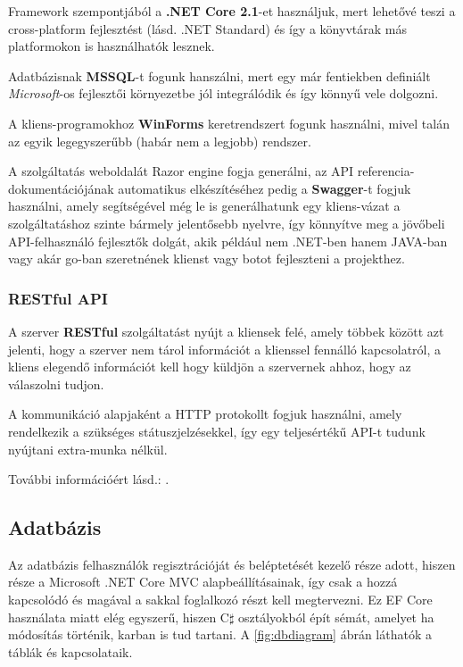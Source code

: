 \documentclass[twoside, a4paper, 12pt]{book}
\begin{document}
Framework szempontjából a \textbf{.NET Core 2.1}-et használjuk, mert lehetővé teszi a cross-platform fejlesztést (lásd. .NET Standard) és így a könyvtárak más platformokon is használhatók lesznek.

Adatbázisnak \textbf{MSSQL}-t fogunk hanszálni, mert egy már fentiekben definiált \textit{Microsoft}-os fejlesztői környezetbe jól integrálódik és így könnyű vele dolgozni.

A kliens-programokhoz \textbf{WinForms} keretrendszert fogunk használni, mivel talán az egyik legegyszerűbb (habár nem a legjobb) rendszer.

A szolgáltatás weboldalát Razor engine fogja generálni, az API referencia-dokumentációjának automatikus elkészítéséhez pedig a \textbf{Swagger}-t fogjuk használni, amely segítségével még le is generálhatunk egy kliens-vázat a szolgáltatáshoz szinte bármely jelentősebb nyelvre, így könnyítve meg a jövőbeli API-felhasználó fejlesztők dolgát, akik például nem .NET-ben hanem JAVA-ban vagy akár go-ban szeretnének klienst vagy botot fejleszteni a projekthez.

\subsubsection{RESTful API}
A szerver \textbf{RESTful} szolgáltatást nyújt a kliensek felé, amely többek között azt jelenti, hogy a szerver nem tárol információt a klienssel fennálló kapcsolatról, a kliens elegendő információt kell hogy küldjön a szervernek ahhoz, hogy az válaszolni tudjon.

A kommunikáció alapjaként a HTTP protokollt fogjuk használni, amely rendelkezik a szükséges státuszjelzésekkel, így egy teljesértékű API-t tudunk nyújtani extra-munka nélkül.

További információért lásd.: \cite{restfulEn}.

\subsection{Adatbázis}
Az adatbázis felhasználók regisztrációját és beléptetését kezelő része adott, hiszen része a Microsoft .NET Core MVC alapbeállításainak, így csak a hozzá kapcsolódó és magával a sakkal foglalkozó részt kell megtervezni. Ez EF Core használata miatt elég egyszerű, hiszen C$\sharp$ osztályokból épít sémát, amelyet ha módosítás történik, karban is tud tartani. A \ref{fig:dbdiagram} ábrán láthatók a táblák és kapcsolataik.
\end{document}

